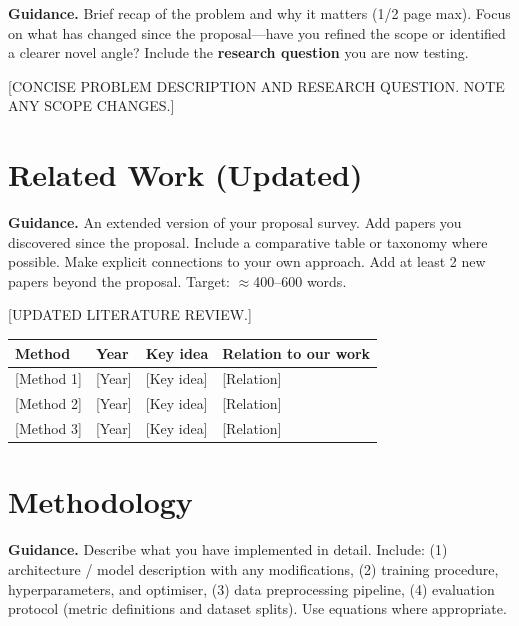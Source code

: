 \documentclass[11pt, letterpaper]{article}
\begin{document}
\begin{guidancebox}
\textbf{Guidance.} Brief recap of the problem and why it matters (1/2 page max).
Focus on what has changed since the proposal---have you refined the scope or identified
a clearer novel angle? Include the \textbf{research question} you are now testing.
\end{guidancebox}

[CONCISE PROBLEM DESCRIPTION AND RESEARCH QUESTION. NOTE ANY SCOPE CHANGES.]

\section{Related Work (Updated)}

\begin{guidancebox}
\textbf{Guidance.} An extended version of your proposal survey. Add papers you
discovered since the proposal. Include a comparative table or taxonomy where possible.
Make explicit connections to your own approach. Add at least 2 new papers beyond
the proposal. Target: $\approx$400--600 words.
\end{guidancebox}

[UPDATED LITERATURE REVIEW.]

\begin{center}
\begin{tabular}{llp{4cm}p{4cm}}
\toprule
\textbf{Method} & \textbf{Year} & \textbf{Key idea} & \textbf{Relation to our work} \\
\midrule
{[Method 1]} & [Year] & [Key idea] & [Relation] \\
{[Method 2]} & [Year] & [Key idea] & [Relation] \\
{[Method 3] }& [Year] & [Key idea] & [Relation] \\
\bottomrule
\end{tabular}
\end{center}

\section{Methodology}

\begin{guidancebox}
\textbf{Guidance.} Describe what you have implemented in detail. Include:
(1) architecture / model description with any modifications,
(2) training procedure, hyperparameters, and optimiser,
(3) data preprocessing pipeline,
(4) evaluation protocol (metric definitions and dataset splits).
Use equations where appropriate.
\end{guidancebox}
\end{document}
